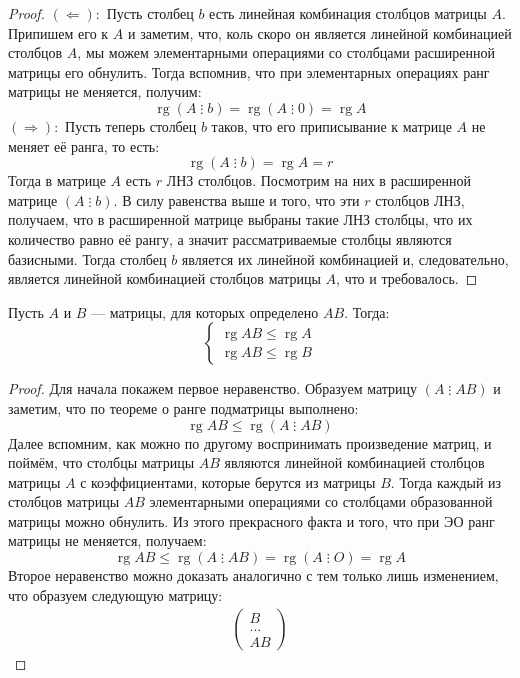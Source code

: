 \documentclass[11pt]{article}
\DeclareMathOperator{\rg}{rg}
\begin{document}
\begin{proof}
    $(\Longleftarrow):$ Пусть столбец $b$ есть линейная комбинация столбцов матрицы $A$.
    Припишем его к $A$ и заметим, что, коль скоро он является линейной комбинацией столбцов $A$, мы 
    можем элементарными операциями со столбцами расширенной матрицы его обнулить. Тогда вспомнив, что 
    при элементарных операциях ранг матрицы не меняется, получим:
    \[\rg \left(A \; \vdots \; b\right) = \rg \left(A \; \vdots \; 0 \right) = \rg A\]
    $(\Longrightarrow):$ Пусть теперь столбец $b$ таков, что его приписывание к матрице $A$ не меняет её ранга, 
    то есть:
    \[\rg \left(A \; \vdots \; b\right) = \rg A = r\]
    Тогда в матрице $A$ есть $r$ ЛНЗ столбцов. Посмотрим на них в расширенной матрице $\left(A \; \vdots \; b\right)$.
    В силу равенства выше и того, что эти $r$ столбцов ЛНЗ, получаем, что в расширенной матрице выбраны 
    такие ЛНЗ столбцы, что их количество равно её рангу, а значит рассматриваемые столбцы 
    являются базисными. Тогда столбец $b$ является их линейной комбинацией и, следовательно, является 
    линейной комбинацией столбцов матрицы $A$, что и требовалось.
\end{proof}

\begin{theorem}
    Пусть $A$ и $B$ --- матрицы, для которых определено $AB$. Тогда:
    \begin{equation*}
        \begin{cases}
            \rg AB \leq \rg A \\
            \rg AB \leq \rg B
        \end{cases}
    \end{equation*}
\end{theorem}

\begin{proof}
    Для начала покажем первое неравенство. Образуем матрицу $\left(A \; \vdots \; AB \right)$ и заметим, что 
    по теореме о ранге подматрицы выполнено:
    \[\rg AB \leq \rg \left(A \; \vdots \; AB \right)\]
    Далее вспомним, как можно по другому воспринимать произведение матриц, и поймём, что 
    столбцы матрицы $AB$ являются линейной комбинацией столбцов матрицы $A$ с коэффициентами, которые берутся из матрицы $B$.
    Тогда каждый из столбцов матрицы $AB$ элементарными операциями со столбцами образованной матрицы можно обнулить. Из 
    этого прекрасного факта и того, что при ЭО ранг матрицы не меняется, получаем:
    \[\rg AB \leq \rg \left(A \; \vdots \; AB \right) = \rg \left(A \; \vdots \; O\right) = \rg A\]
    Второе неравенство можно доказать аналогично с тем только лишь изменением, что образуем следующую матрицу:
    \begin{eqnarray*}
        \begin{pmatrix}
            B \\
            \ldots \\
            AB
        \end{pmatrix}
    \end{eqnarray*}
\end{proof}
\end{document}

